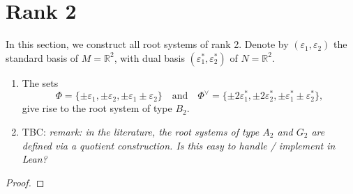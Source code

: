\chapter{Rank 2}
\label{cha:rank-2}
In this section, we construct all root systems of rank 2. Denote by $(\varepsilon_1, \varepsilon_2)$ the standard basis of $M = \mathbb{R}^2$, 
with dual basis $(\varepsilon_1^*, \varepsilon_2^*)$ of $N = \mathbb{R}^2$.\\

\begin{lemma}
    \label{rank2:construct}
    \begin{enumerate}
        \item The sets 
\[
    \Phi = \{\pm \varepsilon_1, \pm \varepsilon_2, \pm\varepsilon_1\pm\varepsilon_2\} \quad \text{and} \quad
    \Phi^\vee = \{\pm 2\varepsilon^*_1, \pm 2 \varepsilon^*_2, \pm \varepsilon_1^* \pm \varepsilon_2^* \},
\]
give rise to the root system of type $B_2$.
        \item TBC: {\it remark: in the literature, the root systems of type $A_2$ and $G_2$ are defined via a 
        quotient construction. Is this easy to handle / implement in Lean?}
    \end{enumerate}
\end{lemma}
\begin{proof}

\end{proof}
